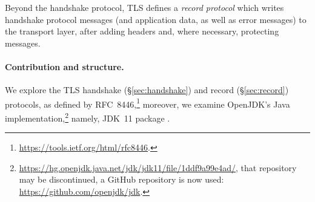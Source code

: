Beyond the handshake protocol, TLS defines a \emph{record protocol} which 
writes handshake protocol messages (and application data, as well as 
error messages) to the transport layer, after adding headers and, where
necessary, protecting messages. 

\paragraph{Contribution and structure.}

We explore the TLS handshake (\S\ref{sec:handshake}) and record (\S\ref{sec:record})
protocols, as defined by RFC~8446,\footnote{\url{https://tools.ietf.org/html/rfc8446}.}
moreover, we examine OpenJDK's Java 
implementation,\footnote{\url{https://hg.openjdk.java.net/jdk/jdk11/file/1ddf9a99e4ad/}, 
 that repository may be discontinued, a GitHub repository is now used:
 \url{https://github.com/openjdk/jdk}.
} 
namely, JDK~11 package .

